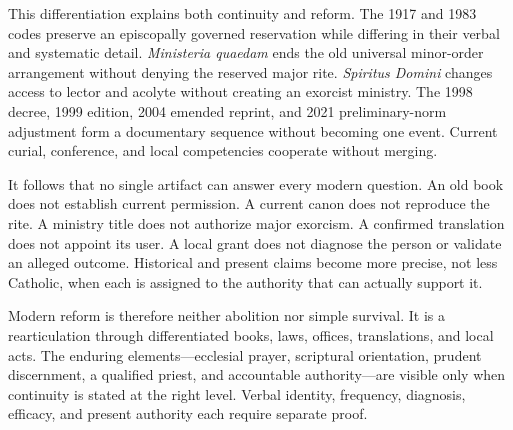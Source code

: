This differentiation explains both continuity and reform. The 1917 and 1983
codes preserve an episcopally governed reservation while differing in their
verbal and systematic detail. \emph{Ministeria quaedam} ends the old universal
minor-order arrangement without denying the reserved major rite.
\emph{Spiritus Domini} changes access to lector and acolyte without creating
an exorcist ministry. The 1998 decree, 1999 edition, 2004 emended reprint, and
2021 preliminary-norm adjustment form a documentary sequence without becoming
one event. Current curial, conference, and local competencies cooperate
without merging.

It follows that no single artifact can answer every modern question. An old
book does not establish current permission. A current canon does not reproduce
the rite. A ministry title does not authorize major exorcism. A confirmed
translation does not appoint its user. A local grant does not diagnose the
person or validate an alleged outcome. Historical and present claims become
more precise, not less Catholic, when each is assigned to the authority that
can actually support it.

Modern reform is therefore neither abolition nor simple survival. It is a
rearticulation through differentiated books, laws, offices, translations, and
local acts. The enduring elements---ecclesial prayer, scriptural orientation,
prudent discernment, a qualified priest, and accountable authority---are
visible only when continuity is stated at the right level. Verbal identity,
frequency, diagnosis, efficacy, and present authority each require separate
proof.
